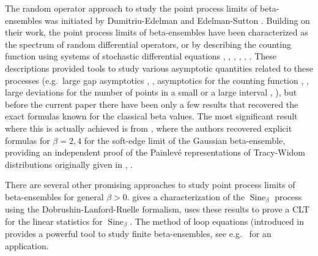 \documentclass[12pt]{article}
\theoremstyle{definition} %
\theoremstyle{remark} %
\newcommand{\Sineb}{\operatorname{Sine}_{\beta}}
\begin{document}


 








The random operator approach to study the point process limits of beta-ensembles was initiated by Dumitriu-Edelman \cite{DE} and Edelman-Sutton \cite{ES}. Building on their work, the point process limits of beta-ensembles have been characterized as the spectrum of random differential operators, or by describing the counting function using systems of stochastic differential equations \cite{RRV}, \cite{RR}, \cite{KS}, \cite{BVBV}, \cite{BVBV_sbo}, \cite{LV_HP}. These descriptions provided tools to study various asymptotic quantities related to these processes (e.g.~large gap asymptotics \cite{BVBV2}, \cite{RRZ}, asymptotics for the counting function \cite{KVV}, \cite{HP2018}, large deviations for the number of points in a small or a large interval \cite{HV}, \cite{HV2}), but before the current paper there have been only a few results that recovered the exact formulas known for the classical beta values. The most significant result where this is actually achieved  is from \cite{Spike1}, where  the authors recovered explicit formulas for $\beta=2,4$ for the soft-edge limit of the Gaussian beta-ensemble, providing an independent proof of the Painlev\'e representations of 
Tracy-Widom distributions originally given in \cite{TW1994}, \cite{TW1996}.

There are several other promising approaches to study point process limits of beta-ensembles for general $\beta>0$. \cite{DLR2021} gives a characterization of the $\Sineb$ process using the Dobrushin-Lanford-Ruelle formalism, \cite{Leble2021} uses these results to prove a CLT for the linear statistics for $\Sineb$. 
The method of loop equations (introduced in \cite{Johansson1998} provides a powerful tool to study finite beta-ensembles, see e.g.~\cite{Lambert2021} for an application.
\end{document}
